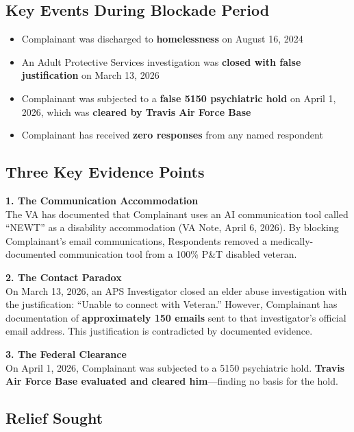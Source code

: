 \documentclass[12pt,letterpaper]{article}
\begin{document}
\subsection{Key Events During Blockade Period}

\begin{itemize}[noitemsep]
    \item Complainant was discharged to \textbf{homelessness} on August 16, 2024
    \item An Adult Protective Services investigation was \textbf{closed with false justification} on March 13, 2026
    \item Complainant was subjected to a \textbf{false 5150 psychiatric hold} on April 1, 2026, which was \textbf{cleared by Travis Air Force Base}
    \item Complainant has received \textbf{zero responses} from any named respondent
\end{itemize}

\subsection{Three Key Evidence Points}

\textbf{1. The Communication Accommodation}\\
The VA has documented that Complainant uses an AI communication tool called ``NEWT'' as a disability accommodation (VA Note, April 6, 2026). By blocking Complainant's email communications, Respondents removed a medically-documented communication tool from a 100\% P\&T disabled veteran.

\textbf{2. The Contact Paradox}\\
On March 13, 2026, an APS Investigator closed an elder abuse investigation with the justification: ``Unable to connect with Veteran.'' However, Complainant has documentation of \textbf{approximately 150 emails} sent to that investigator's official email address. This justification is contradicted by documented evidence.

\textbf{3. The Federal Clearance}\\
On April 1, 2026, Complainant was subjected to a 5150 psychiatric hold. \textbf{Travis Air Force Base evaluated and cleared him}---finding no basis for the hold.

\subsection{Relief Sought}
\end{document}
